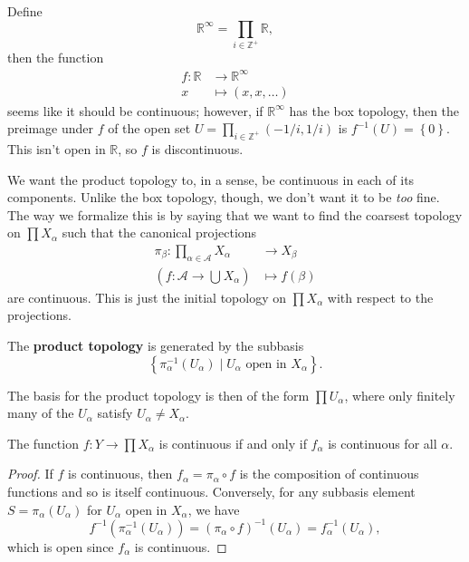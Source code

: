 \documentclass[10pt]{report}
\begin{document}
\begin{ex}[]
Define
\[
\mathbb{R}^{\infty}=\prod_{i \in \mathbb{Z}^{+}}\mathbb{R},
\] then the function
\begin{align*}
	f:\mathbb{R}&\to \mathbb{R}^{\infty}\\
	x&\mapsto (x,x,\dots)
\end{align*}
seems like it should be continuous; however, if $\mathbb{R}^{\infty}$ has the box topology, then the preimage under $f$ of the open set $U = \prod_{i \in \mathbb{Z}^{+}}(-1/i, 1/i)$ is $f^{-1}(U) = \left\{ 0 \right\}$. This isn't open in $\mathbb{R}$, so $f$ is discontinuous.
\end{ex}

We want the product topology to, in a sense, be continuous in each of its components. Unlike the box topology, though, we don't want it to be \textit{too} fine. The way we formalize this is by saying that we want to find the coarsest topology on $\prod X_{\alpha}$ such that the canonical projections
\begin{align*}
	\pi_{\beta}: \prod_{\alpha \in \mathcal{A}} X_{\alpha} &\to X_{\beta} \\
	(f:\mathcal{A}\to \bigcup_{}X_{\alpha}) &\mapsto f(\beta)
\end{align*}
are continuous. This is just the initial topology on $\prod X_{\alpha}$ with respect to the projections.

\begin{defn}[]
The \textbf{product topology} is generated by the subbasis
\[
	\left\{ \pi_{\alpha}^{-1}(U_{\alpha}) \;|\; U_{\alpha} \text{ open in } X _{\alpha} \right\}.
\]
\end{defn}
The basis for the product topology is then of the form $\prod U_{\alpha}$, where only finitely many of the $U_{\alpha}$ satisfy $U_{\alpha}\neq X_{\alpha}$.

\begin{prop}
The function $f:Y\to \prod X_{\alpha}$ is continuous if and only if $f_{\alpha}$ is continuous for all $\alpha$.
\end{prop}
\begin{proof}
	If $f$ is continuous, then $f_{\alpha}=\pi_{\alpha} \circ f$ is the composition of continuous functions and so is itself continuous. Conversely, for any subbasis element $S = \pi_{\alpha}(U_{\alpha})$ for $U_{\alpha}$ open in $X_{\alpha}$, we have
	\[
		f^{-1}(\pi_{\alpha}^{-1}(U_{\alpha})) = (\pi_{\alpha} \circ f)^{-1}(U_{\alpha}) = f_{\alpha}^{-1}(U_{\alpha}),
	\] which is open since $f_{\alpha}$ is continuous.
\end{proof}
\end{document}
